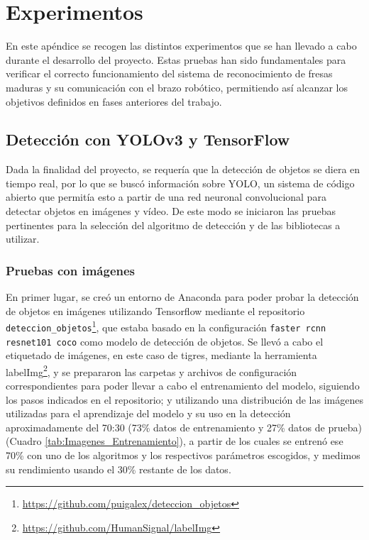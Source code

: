 \chapter{Experimentos}
\label{cap:capitulo8}

En este apéndice se recogen las distintos experimentos que se han llevado a cabo durante el desarrollo del proyecto. Estas pruebas han sido fundamentales para verificar el correcto funcionamiento del sistema de reconocimiento de fresas maduras y su comunicación con el brazo robótico, permitiendo así alcanzar los objetivos definidos en fases anteriores del trabajo.

\section{Detección con YOLOv3 y TensorFlow}
\label{exp_seleccion_algoritmo}

Dada la finalidad del proyecto, se requería que la detección de objetos se diera en tiempo real, por lo que se buscó información sobre YOLO, un sistema de código abierto que permitía esto a partir de una red neuronal convolucional para detectar objetos en imágenes y vídeo. De este modo se iniciaron las pruebas pertinentes para la selección del algoritmo de detección y de las bibliotecas a utilizar.

\subsection{Pruebas con imágenes}
\label{sec:Pruebas_imgs_TF}

En primer lugar, se creó un entorno de Anaconda para poder probar la detección de objetos en imágenes utilizando Tensorflow mediante el repositorio \verb|deteccion_objetos|\footnote{\url{https://github.com/puigalex/deteccion_objetos}}, que estaba basado en la configuración \verb|faster rcnn resnet101 coco| como modelo de detección de objetos. Se llevó a cabo el etiquetado de imágenes, en este caso de tigres, mediante la herramienta labelImg\footnote{\url{https://github.com/HumanSignal/labelImg}}, y se prepararon las carpetas y archivos de configuración correspondientes para poder llevar a cabo el entrenamiento del modelo, siguiendo los pasos indicados en el repositorio; y utilizando una distribución de las imágenes utilizadas para el aprendizaje del modelo y su uso en la detección aproximadamente del 70:30 (73\% datos de entrenamiento y 27\% datos de prueba)(Cuadro \ref{tab:Imagenes_Entrenamiento}), a partir de los cuales se entrenó ese 70\% con uno de los algoritmos y los respectivos parámetros escogidos, y medimos su rendimiento usando el 30\% restante de los datos.\\

